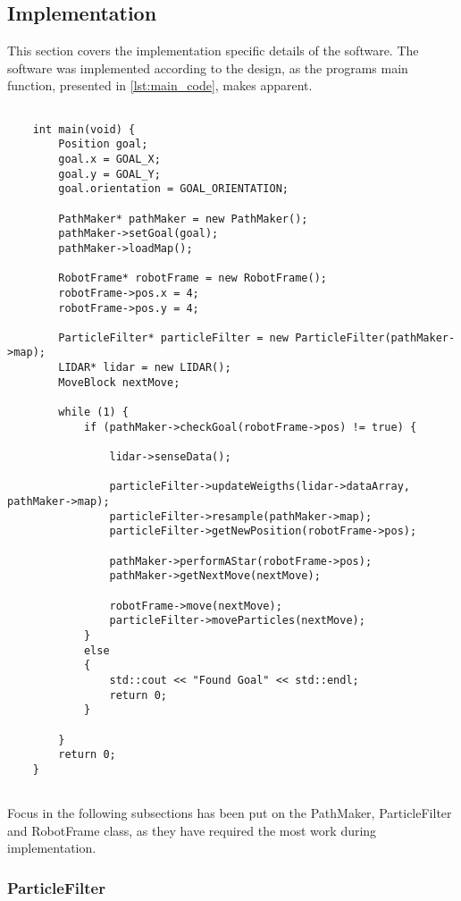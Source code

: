 \documentclass[Main]{subfiles}
\begin{document}
	
	\subsection{Implementation} %
	\label{sub:software_implementation}
	
	This section covers the implementation specific details of the software.
	The software was implemented according to the design, as the programs main function, presented in \autoref{lst:main_code}, makes apparent.

	\begin{lstlisting}[caption=Main Function of Progam, style=Code-C++, label=lst:main_code]
	
	int main(void) {
		Position goal;
		goal.x = GOAL_X;
		goal.y = GOAL_Y;
		goal.orientation = GOAL_ORIENTATION;
	
		PathMaker* pathMaker = new PathMaker();
		pathMaker->setGoal(goal);
		pathMaker->loadMap();
	
		RobotFrame* robotFrame = new RobotFrame();
		robotFrame->pos.x = 4;
		robotFrame->pos.y = 4;
	
		ParticleFilter* particleFilter = new ParticleFilter(pathMaker->map);
		LIDAR* lidar = new LIDAR();
		MoveBlock nextMove;
	
		while (1) {
			if (pathMaker->checkGoal(robotFrame->pos) != true) {
				
				lidar->senseData();
				
				particleFilter->updateWeigths(lidar->dataArray, pathMaker->map);
				particleFilter->resample(pathMaker->map);
				particleFilter->getNewPosition(robotFrame->pos);
				
				pathMaker->performAStar(robotFrame->pos);
				pathMaker->getNextMove(nextMove);
				
				robotFrame->move(nextMove);
				particleFilter->moveParticles(nextMove);
			}
			else
			{
				std::cout << "Found Goal" << std::endl;
				return 0;
			}
	
		}
		return 0;
	}
	
	\end{lstlisting}

	Focus in the following subsections has been put on the PathMaker, ParticleFilter and RobotFrame class, as they have required the most work during implementation.
	
	\subsubsection{ParticleFilter} %
	\label{subsub:software_particlefilter}
	
\end{document}
